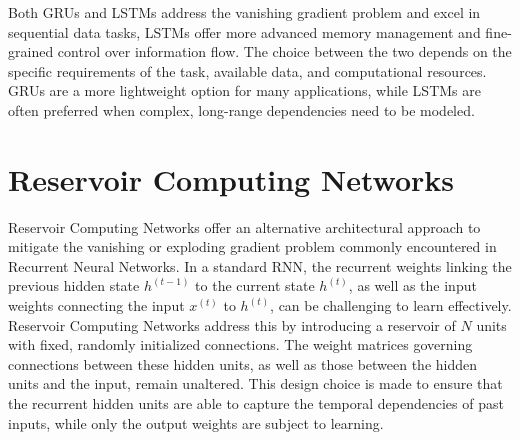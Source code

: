 \begin{figure}[h]
\centering     %
{}
\label{fig:lstm-gru-candidate}
\end{figure}

\noindent Both GRUs and LSTMs address the vanishing gradient problem and excel in sequential data tasks, LSTMs offer more advanced memory management and fine-grained control over information flow. The choice between the two depends on the specific requirements of the task, available data, and computational resources. GRUs are a more lightweight option for many applications, while LSTMs are often preferred when complex, long-range dependencies need to be modeled.


\section{Reservoir Computing Networks}

Reservoir Computing Networks offer an alternative architectural approach to mitigate the vanishing or exploding gradient problem commonly encountered in Recurrent Neural Networks. In a standard RNN, the recurrent weights linking the previous hidden state $h^{(t-1)}$ to the current state $h^{(t)}$, as well as the input weights connecting the input $x^{(t)}$ to $h^{(t)}$, can be challenging to learn effectively. Reservoir Computing Networks address this by introducing a reservoir of $N$ units with fixed, randomly initialized connections. The weight matrices governing connections between these hidden units, as well as those between the hidden units and the input, remain unaltered. This design choice is made to ensure that the recurrent hidden units are able to capture the temporal dependencies of past inputs, while only the output weights are subject to learning.

